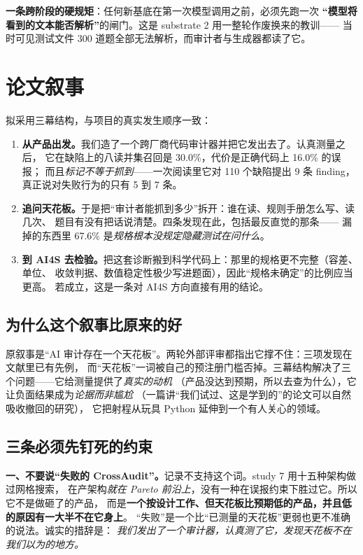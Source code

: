 \documentclass[11pt,a4paper]{article}
\begin{document}
\textbf{一条跨阶段的硬规矩}：任何新基底在第一次模型调用之前，必须先跑一次
\textbf{“模型将看到的文本能否解析”}的闸门。这是 substrate 2 用一整轮作废换来的教训——
当时可见测试文件 300 道题全部无法解析，而审计者与生成器都读了它。

\section{论文叙事}

拟采用三幕结构，与项目的真实发生顺序一致：

\begin{enumerate}[label=\textbf{第 \arabic* 幕}]
\item \textbf{从产品出发。}我们造了一个跨厂商代码审计器并把它发出去了。认真测量之后，
      它在缺陷上的八读并集召回是 30.0\%，代价是正确代码上 16.0\% 的误报；
      而且\emph{标记不等于抓到}——一次阅读里它对 110 个缺陷提出 9 条 finding，
      真正说对失败行为的只有 5 到 7 条。
\item \textbf{追问天花板。}于是把“审计者能抓到多少”拆开：谁在读、规则手册怎么写、读几次、
      题目有没有把话说清楚。四条发现在此，包括最反直觉的那条——
      漏掉的东西里 67.6\% 是\emph{规格根本没规定隐藏测试在问什么}。
\item \textbf{到 AI4S 去检验。}把这套诊断搬到科学代码上：那里的规格更不完整（容差、单位、
      收敛判据、数值稳定性极少写进题面），因此“规格未确定”的比例应当更高。
      若成立，这是一条对 AI4S 方向直接有用的结论。
\end{enumerate}

\subsection{为什么这个叙事比原来的好}

原叙事是“AI 审计存在一个天花板”。两轮外部评审都指出它撑不住：三项发现在文献里已有先例，
而“天花板”一词被自己的预注册门槛否掉。三幕结构解决了三个问题——它给测量提供了\emph{真实的动机}
（产品没达到预期，所以去查为什么），它让负面结果成为\emph{论据而非尴尬}
（一篇讲“我们试过、这是学到的”的论文可以自然吸收撤回的研究），
它把射程从玩具 Python 延伸到一个有人关心的领域。

\subsection{三条必须先钉死的约束}

\textbf{一、不要说“失败的 CrossAudit”。}记录不支持这个词。study 7 用十五种架构做过网格搜索，
在产架构\emph{就在 Pareto 前沿上}，没有一种在误报约束下胜过它。所以它不是做砸了的产品，
而是\textbf{一个按设计工作、但天花板比预期低的产品，并且低的原因有一大半不在它身上}。
“失败”是一个比“已测量的天花板”更弱也更不准确的说法。诚实的措辞是：
\emph{我们发出了一个审计器，认真测了它，发现天花板不在我们以为的地方。}
\end{document}
